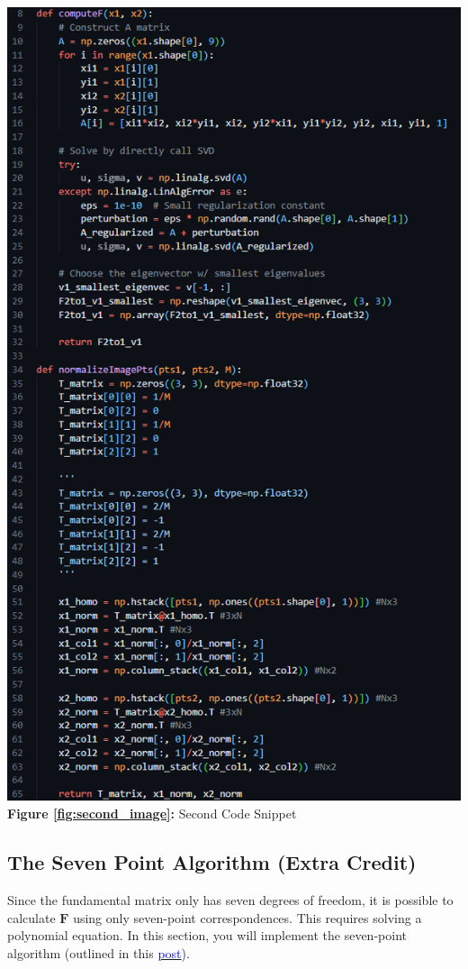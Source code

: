 \begin{your_solution}[title=Q2.1,height=23.2cm,width=\linewidth]
\begin{minipage}{0.48\linewidth}
	\includegraphics[width=\linewidth, height=1.43\columnwidth]{../Q2_1_cns2.png}
	\textbf{Figure \ref{fig:second_image}:} Second Code Snippet  %
	\label{fig:second_image}         %
\end{minipage}


\end{your_solution}

\subsection{The Seven Point Algorithm (Extra Credit)}

Since the fundamental matrix only has seven degrees of freedom, it is possible to calculate $\textbf{F}$ using only seven-point correspondences. This requires solving a polynomial equation.  In this section, you will implement the seven-point algorithm  (outlined in this \href{https://imkaywu.github.io/blog/2017/06/fundamental-matrix/}{\textcolor{blue}{post}}). 

